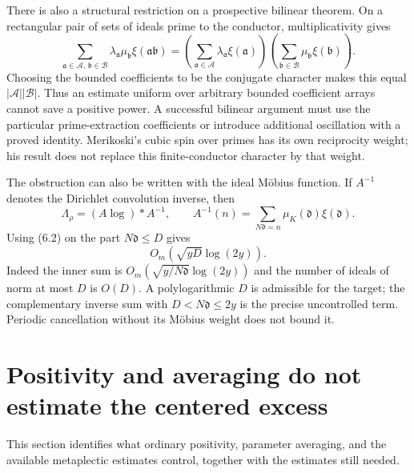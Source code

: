 \documentclass[11pt]{article}
\begin{document}
There is also a structural restriction on a prospective bilinear theorem. On a rectangular pair of sets of ideals prime to the conductor, multiplicativity gives
\[
 \sum_{\mathfrak a\in\mathcal A,\,\mathfrak b\in\mathcal B}
    \lambda_{\mathfrak a}\mu_{\mathfrak b}\xi(\mathfrak a\mathfrak b)
 =\left(\sum_{\mathfrak a\in\mathcal A}\lambda_{\mathfrak a}\xi(\mathfrak a)\right)
  \left(\sum_{\mathfrak b\in\mathcal B}\mu_{\mathfrak b}\xi(\mathfrak b)\right).
\]
Choosing the bounded coefficients to be the conjugate character makes this equal $|\mathcal A||\mathcal B|$. Thus an estimate uniform over arbitrary bounded coefficient arrays cannot save a positive power. A successful bilinear argument must use the particular prime-extraction coefficients or introduce additional oscillation with a proved identity. Merikoski's cubic spin over primes has its own reciprocity weight; his result does not replace this finite-conductor character by that weight.

The obstruction can also be written with the ideal M\"obius function. If $A^{-1}$ denotes the Dirichlet convolution inverse, then
\[
 \Lambda_\rho=(A\log)*A^{-1},\qquad
 A^{-1}(n)=\sum_{N\mathfrak d=n}\mu_K(\mathfrak d)\xi(\mathfrak d).
 \tag{6.8}
\]
Using (6.2) on the part $N\mathfrak d\le D$ gives
\[
 O_m(\sqrt{yD}\log(2y)).
 \tag{6.9}
\]
Indeed the inner sum is $O_m(\sqrt{y/N\mathfrak d}\log(2y))$ and the number of ideals of norm at most $D$ is $O(D)$. A polylogarithmic $D$ is admissible for the target; the complementary inverse sum with $D<N\mathfrak d\le2y$ is the precise uncontrolled term. Periodic cancellation without its M\"obius weight does not bound it.

\section{Positivity and averaging do not estimate the centered excess}
This section identifies what ordinary positivity, parameter averaging, and the available metaplectic estimates control, together with the estimates still needed.
\end{document}

